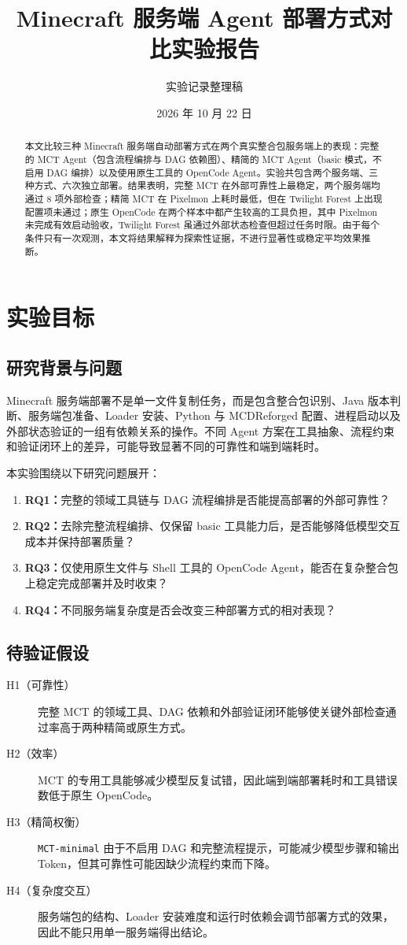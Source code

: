 \documentclass[UTF8,a4paper,11pt]{ctexart}
\title{Minecraft 服务端 Agent 部署方式对比实验报告}
\author{实验记录整理稿}
\date{2026 年 10 月 22 日}
\newcommand{\mctminimal}{\texttt{MCT-minimal}}
\begin{document}
\maketitle

\begin{abstract}
本文比较三种 Minecraft 服务端自动部署方式在两个真实整合包服务端上的表现：完整的 MCT Agent（包含流程编排与 DAG 依赖图）、精简的 MCT Agent（basic 模式，不启用 DAG 编排）以及使用原生工具的 OpenCode Agent。实验共包含两个服务端、三种方式、六次独立部署。结果表明，完整 MCT 在外部可靠性上最稳定，两个服务端均通过 8 项外部检查；精简 MCT 在 Pixelmon 上耗时最低，但在 Twilight Forest 上出现配置项未通过；原生 OpenCode 在两个样本中都产生较高的工具负担，其中 Pixelmon 未完成有效启动验收，Twilight Forest 虽通过外部状态检查但超过任务时限。由于每个条件只有一次观测，本文将结果解释为探索性证据，不进行显著性或稳定平均效果推断。
\end{abstract}

\section{实验目标}

\subsection{研究背景与问题}
Minecraft 服务端部署不是单一文件复制任务，而是包含整合包识别、Java 版本判断、服务端包准备、Loader 安装、Python 与 MCDReforged 配置、进程启动以及外部状态验证的一组有依赖关系的操作。不同 Agent 方案在工具抽象、流程约束和验证闭环上的差异，可能导致显著不同的可靠性和端到端耗时。

本实验围绕以下研究问题展开：
\begin{enumerate}
  \item \textbf{RQ1：}完整的领域工具链与 DAG 流程编排是否能提高部署的外部可靠性？
  \item \textbf{RQ2：}去除完整流程编排、仅保留 basic 工具能力后，是否能够降低模型交互成本并保持部署质量？
  \item \textbf{RQ3：}仅使用原生文件与 Shell 工具的 OpenCode Agent，能否在复杂整合包上稳定完成部署并及时收束？
  \item \textbf{RQ4：}不同服务端复杂度是否会改变三种部署方式的相对表现？
\end{enumerate}

\subsection{待验证假设}
\begin{description}
  \item[H1（可靠性）] 完整 MCT 的领域工具、DAG 依赖和外部验证闭环能够使关键外部检查通过率高于两种精简或原生方式。
  \item[H2（效率）] MCT 的专用工具能够减少模型反复试错，因此端到端部署耗时和工具错误数低于原生 OpenCode。
  \item[H3（精简权衡）] \mctminimal{} 由于不启用 DAG 和完整流程提示，可能减少模型步骤和输出 Token，但其可靠性可能因缺少流程约束而下降。
  \item[H4（复杂度交互）] 服务端包的结构、Loader 安装难度和运行时依赖会调节部署方式的效果，因此不能只用单一服务端得出结论。
\end{description}
\end{document}
